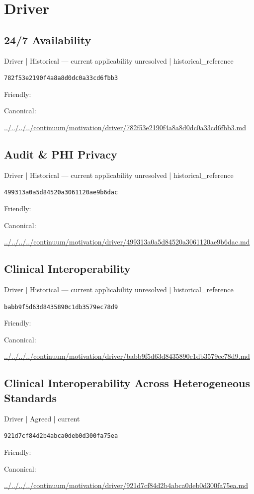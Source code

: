 \documentclass[10pt,a4paper]{article}
\begin{document}
\section*{Driver}
\subsection*{24/7 Availability}
{\small Driver | Historical — current applicability unresolved | historical\_reference}\par
\texttt{782f53e2190f4a8a8d0dc0a33cd6fbb3}\par
Friendly: \par
Canonical: \par
{\footnotesize\url{../../../../continuum/motivation/driver/782f53e2190f4a8a8d0dc0a33cd6fbb3.md}}\par
\subsection*{Audit \& PHI Privacy}
{\small Driver | Historical — current applicability unresolved | historical\_reference}\par
\texttt{499313a0a5d84520a3061120ae9b6dac}\par
Friendly: \par
Canonical: \par
{\footnotesize\url{../../../../continuum/motivation/driver/499313a0a5d84520a3061120ae9b6dac.md}}\par
\subsection*{Clinical Interoperability}
{\small Driver | Historical — current applicability unresolved | historical\_reference}\par
\texttt{babb9f5d63d8435890c1db3579ec78d9}\par
Friendly: \par
Canonical: \par
{\footnotesize\url{../../../../continuum/motivation/driver/babb9f5d63d8435890c1db3579ec78d9.md}}\par
\subsection*{Clinical Interoperability Across Heterogeneous Standards}
{\small Driver | Agreed | current}\par
\texttt{921d7cf84d2b4abca0deb0d300fa75ea}\par
Friendly: \par
Canonical: \par
{\footnotesize\url{../../../../continuum/motivation/driver/921d7cf84d2b4abca0deb0d300fa75ea.md}}\par
\end{document}
